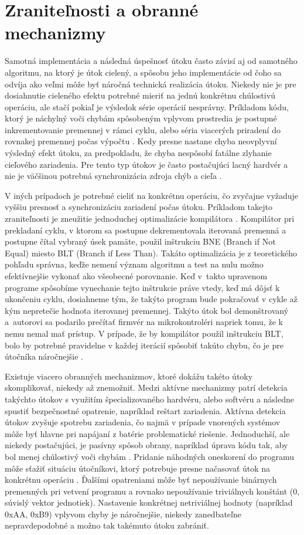 \section{Zraniteľnosti a obranné mechanizmy}
Samotná implementácia a následná úspešnosť útoku často závisí aj od samotného algoritmu, na ktorý je útok cielený, a spôsobu jeho implementácie od čoho sa odvíja ako veľmi môže byť náročná technická realizácia útoku. Niekedy nie je pre dosiahnutie cieleného efektu potrebné mieriť na jednú konkrétnu chúlostivú operáciu, ale stačí pokiaľ je výsledok série operácií nesprávny. Príkladom kódu, ktorý je náchylný voči chybám spôsobeným vplyvom prostredia je postupné inkrementovanie premennej v rámci cyklu, alebo séria viacerých priradení do rovnakej premennej počas výpočtu \cite{crowbars}. Kedy presne nastane chyba neovplyvní výsledný efekt útoku, za predpokladu, že chyba nespôsobí fatálne zlyhanie cieľového zariadenia. Pre tento typ útokov je často postačujúci lacný hardvér a nie je väčšinou potrebná synchronizácia zdroja chýb a cieľa \cite{crowbars, vccOnTheCheap}.

V iných prípadoch je potrebné cieliť na konkrétnu operáciu, čo zvyčajne vyžaduje vyššiu presnosť a synchronizáciu zariadení počas útoku. Príkladom takejto zraniteľnosti je zneužitie jednoduchej optimalizácie kompilátora \cite{AntiFI}. Kompilátor pri prekladaní cyklu, v ktorom sa postupne dekrementovala iterovaná premenná a postupne čítal vybraný úsek pamäte, použil inštrukciu BNE (Branch if Not Equal) miesto BLT (Branch if Less Than). Takáto optimalizácia je z teoretického pohľadu správna, keďže nemení význam algoritmu a test na nulu možno efektívnejšie vykonať ako všeobecné porovnanie. Keď v~takto upravenom programe spôsobíme vynechanie tejto inštrukcie práve vtedy, keď má dôjsť k ukončeniu cyklu, dosiahneme tým, že takýto program bude pokračovať v cykle až kým nepretečie hodnota iterovanej premennej. Takýto útok bol demonštrovaný a~autorovi sa podarilo prečítať firmvér na mikrokontroléri napriek tomu, že k nemu nemal mať prístup. V prípade, že by kompilátor použil inštrukciu BLT, bolo by potrebné pravidelne v každej iterácií spôsobiť takúto chybu, čo je pre útočníka náročnejšie \cite{AntiFI}.

Existuje viacero obranných mechanizmov, ktoré dokážu takéto útoky skomplikovať, niekedy až znemožniť. Medzi aktívne mechanizmy patrí detekcia takýchto útokov s využitím špecializovaného hardvéru, alebo softvéru a následne spustiť bezpečnostné opatrenie, napríklad reštart zariadenia. Aktívna detekcia útokov zvyšuje spotrebu zariadenia, čo najmä v prípade vnorených systémov môže byť hlavne pri napájaní z batérie problematické riešenie. Jednoduchší, ale niekedy postačujúci, je pasívny spôsob obrany, napríklad úprava kódu tak, aby bol menej chúlostivý voči chybám \cite{AntiFI}. Pridanie náhodných oneskorení do programu môže sťažiť situáciu útočníkovi, ktorý potrebuje presne načasovať útok na konkrétnu operáciu \cite{AntiFI}. Ďalšími opatreniami môže byť nepoužívanie binárnych premenných pri vetvení programu a rovnako nepoužívanie triviálnych konštánt (0, súvislý vektor jednotiek). Nastavenie konkrétnej netriviálnej hodnoty (napríklad 0xAA, 0xB9) vplyvom chyby je náročnejšie, niekedy zanedbateľne nepravdepodobné a možno tak takémuto útoku zabrániť.